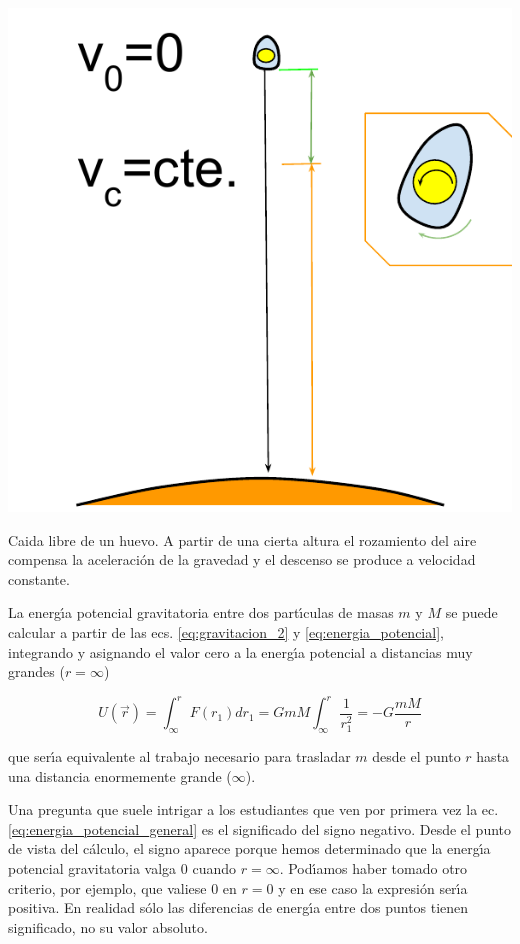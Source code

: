 

\begin{marginfigure}
  \includegraphics[width=\linewidth]{HuevoSuicida.pdf}
  \caption{Caida libre de un huevo. A partir de una cierta altura el rozamiento del aire compensa la aceleraci\'on de la gravedad y el descenso se produce a velocidad constante.}
  \label{fig:huevo_suicida}
\end{marginfigure}

La energ\'\i{}a potencial gravitatoria  entre dos part\'\i{}culas de masas $m$ y $M$ se puede calcular a partir de las ecs. \ref{eq:gravitacion_2} y \ref{eq:energia_potencial}, integrando y asignando el valor cero a la energ\'\i{}a potencial a distancias muy grandes ($r=\infty$)

\begin{equation}
U(\vec{r})=\int_{\infty}^{r}F(r_1)dr_1=GmM\int_{\infty}^{r}\frac{1}{r_1^2}=-G\frac{mM}{r}
\label{eq:energia_potencial_general}
\end{equation}

que ser\'\i{}a equivalente al trabajo necesario para trasladar $m$ desde el punto $r$ hasta una distancia enormemente grande ($\infty$). 

Una pregunta que suele intrigar a los estudiantes que ven por primera vez la ec. \ref{eq:energia_potencial_general} es el significado del signo negativo. Desde el punto de vista del c\'alculo, el signo aparece porque hemos determinado que la energ\'\i{}a potencial gravitatoria valga $0$ cuando $r=\infty$. Pod\'\i{}amos haber tomado otro criterio, por ejemplo, que valiese $0$ en $r=0$ y en ese caso la expresi\'on ser\'\i{}a positiva. En realidad s\'olo las diferencias de energ\'\i{}a entre dos puntos tienen significado, no su valor absoluto.


